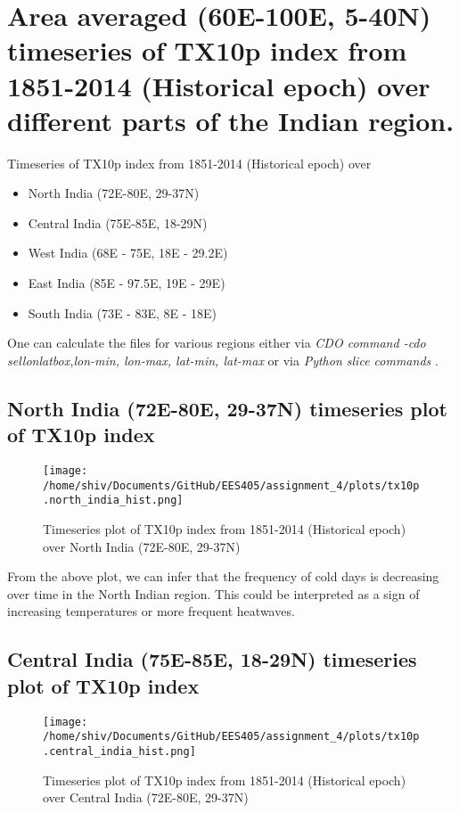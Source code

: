 \documentclass[a4paper, 12pt, twoside]{report}
\begin{document}
\section{Area averaged (60E-100E, 5-40N) timeseries of TX10p index from 1851-2014 (Historical epoch) over different parts of the Indian region.}

Timeseries of TX10p index from 1851-2014 (Historical epoch) over
\begin{itemize}
    \item North India (72E-80E, 29-37N)
    \item Central India (75E-85E, 18-29N)
    \item West India (68E - 75E, 18E - 29.2E)
    \item East India (85E - 97.5E, 19E - 29E)
    \item South India (73E - 83E, 8E - 18E)
\end{itemize}


One can calculate the files for various regions either via \textit{CDO command -cdo sellonlatbox,lon-min, lon-max, lat-min, lat-max} or via \textit{Python slice commands} \cite{cdo}.

\subsection{North India (72E-80E, 29-37N) timeseries plot of TX10p index}

\begin{figure}[h]
    \centering
    \texttt{[image: /home/shiv/Documents/GitHub/EES405/assignment\_4/plots/tx10p.north\_india\_hist.png]}
    \caption{\centering Timeseries plot of TX10p index from 1851-2014 (Historical epoch) over North India (72E-80E, 29-37N)}
    \label{fig:TX10p_timeseries_north_india}
\end{figure}

From the above plot, we can infer that the frequency of cold days is decreasing over time in the North Indian region. This could be interpreted as a sign of increasing temperatures or more frequent heatwaves.



\subsection{Central India (75E-85E, 18-29N) timeseries plot of TX10p index}

\begin{figure}[h]
    \centering
    \texttt{[image: /home/shiv/Documents/GitHub/EES405/assignment\_4/plots/tx10p.central\_india\_hist.png]}
    \caption{\centering Timeseries plot of TX10p index from 1851-2014 (Historical epoch) over Central India (72E-80E, 29-37N)}
    \label{fig:TX10p_timeseries_central_india}
\end{figure}
\end{document}
